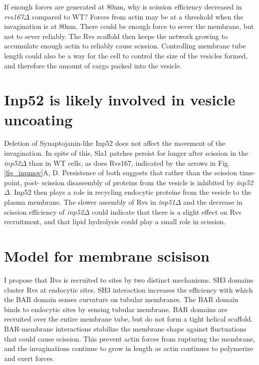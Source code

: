 	\vspace{5mm}
If enough forces are generated at 80nm, why is scission efficiency decreased in \textit{rvs167$\Delta$} compared to WT? 
Forces from actin may be at a threshold when the invagination is at 80nm. There could be enough force to sever the membrane, but not to sever reliably. The Rvs scaffold then keeps the network growing to accumulate enough actin to reliably cause scission. Controlling membrane tube length could also be a way for the cell to control the size of the vesicles formed, and therefore the amount of cargo packed into the vesicle. 





\section{Inp52 is likely involved in vesicle uncoating}
Deletion of Synaptojanin-like Inp52 does not affect the movement of the invagination. In spite of this, Sla1 patches persist for longer after scission in the \textit{inp52$\Delta$} than in WT cells, as does Rvs167, indicated by the arrows in Fig.\ref{fig_inpmov}A, D. Persistence of both suggests that rather than the scission time-point, post- scission disassembly of proteins from the vesicle is inhibited by \textit{inp52$\Delta$}. Inp52 then plays a role in recycling endocytic proteins from the vesicle to the plasma membrane. The slower assembly of Rvs in \textit{inp51$\Delta$}  and the decrease in scission efficiency of \textit{inp52$\Delta$} could indicate that there is a slight effect on Rvs recruitment, and that lipid hydrolysis could play a small role in scission. 


\newpage
\section{Model for membrane scisison}
I propose that Rvs is recruited to sites by two distinct mechanisms. SH3 domains cluster Rvs at endocytic sites. SH3 interaction increases the efficiency with which the BAR domain senses curvature on tubular membranes. The BAR domain binds to endocytic sites by sensing tubular membrane. BAR domains are recruited over the entire membrane tube, but do not form a tight helical scaffold. BAR-membrane interactions stabilize the membrane shape against fluctuations that could cause scission. This prevent actin forces from rupturing the membrane, and the invaginations continue to grow in length as actin continues to polymerize and exert forces. 


